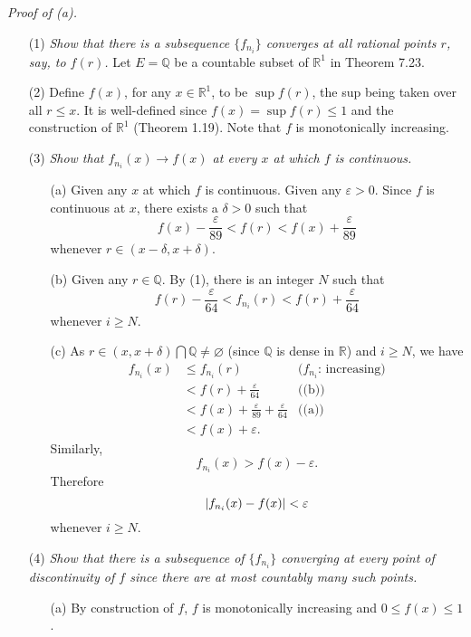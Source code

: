 \documentclass{article}
\begin{document}
\emph{Proof of (a).}
\begin{enumerate}
\item[(1)]
  \emph{Show that there is a subsequence $\{f_{n_i}\}$ converges at all rational points $r$,
  say, to $f(r)$.}
  Let $E = \mathbb{Q}$ be a countable subset of $\mathbb{R}^1$ in Theorem 7.23.

\item[(2)]
  Define $f(x)$, for any $x \in \mathbb{R}^1$, to be $\sup f(r)$,
  the sup being taken over all $r \leq x$.
  It is well-defined since $f(x) = \sup f(r) \leq 1$
  and the construction of $\mathbb{R}^1$ (Theorem 1.19).
  Note that $f$ is monotonically increasing.

\item[(3)]
  \emph{Show that $f_{n_i}(x) \to f(x)$ at every $x$ at which $f$ is continuous.}
  \begin{enumerate}
  \item[(a)]
    Given any $x$ at which $f$ is continuous.
    Given any $\varepsilon > 0$.
    Since $f$ is continuous at $x$, there exists a $\delta > 0$
    such that
    \[
      f(x)-\frac{\varepsilon}{89} < f(r) < f(x)+\frac{\varepsilon}{89}
    \]
    whenever $r \in (x-\delta,x+\delta)$.

  \item[(b)]
    Given any $r \in \mathbb{Q}$.
    By (1), there is an integer $N$ such that
    \[
      f(r)-\frac{\varepsilon}{64} < f_{n_i}(r) < f(r)+\frac{\varepsilon}{64}
    \]
    whenever $i \geq N$.

  \item[(c)]
    As $r \in (x,x+\delta) \bigcap \mathbb{Q} \neq \varnothing$
    (since $\mathbb{Q}$ is dense in $\mathbb{R}$)
    and $i \geq N$, we have
      \begin{align*}
        f_{n_i}(x)
        &\leq f_{n_i}(r)
          &\text{($f_{n_i}$: increasing)} \\
        &< f(r) + \frac{\varepsilon}{64}
          &\text{((b))} \\
        &< f(x)+\frac{\varepsilon}{89} + \frac{\varepsilon}{64}
          &\text{((a))} \\
        &< f(x) + \varepsilon.
      \end{align*}
    Similarly,
    \[
      f_{n_i}(x) > f(x) - \varepsilon.
    \]
    Therefore
    \[
      \abs{ f_{n_i}(x) - f(x) } < \varepsilon
    \]
    whenever $i \geq N$.
  \end{enumerate}

\item[(4)]
  \emph{Show that there is a subsequence of $\{f_{n_i}\}$ converging
  at every point of discontinuity of $f$
  since there are at most countably many such points.}
  \begin{enumerate}
  \item[(a)]
    By construction of $f$, $f$ is monotonically increasing and $0 \leq f(x) \leq 1$.


\end{enumerate}
\end{enumerate}
\end{document}
